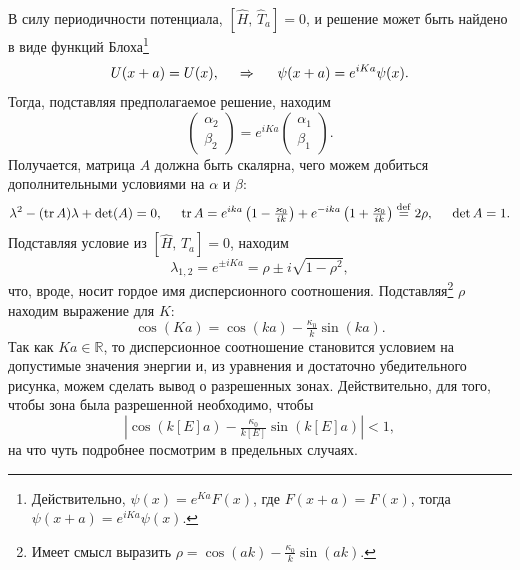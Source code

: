 В силу периодичности потенциала, $[\hat{H},\, \hat{T}_a] = 0$, и решение может быть найдено в виде функций Блоха\footnote{
    Действительно, $\psi(x) = e^{K a} F(x)$, где $F(x+a) = F(x)$, тогда 
    $\psi(x+a) = e^{i K a} \psi(x)$.
} 
\begin{equation*}
    U(x+a) = U(x),
    \hspace{0.5cm} \Rightarrow \hspace{0.5cm}
    \psi(x+a) = e^{i K a} \psi(x).
\end{equation*}
Тогда, подставляя предполагаемое решение, находим
\begin{equation*}
    \begin{pmatrix}
        \alpha_2 \\ \beta_2
    \end{pmatrix} = e^{i K a} \begin{pmatrix}
        \alpha_1 \\ \beta_1
    \end{pmatrix}.
\end{equation*}
Получается, матрица $A$ должна быть скалярна, чего можем добиться дополнительными условиями на $\alpha$ и $\beta$:
\begin{equation*}
    \lambda^2 - (\mathop{\mathrm{tr}}\nolimits A) \lambda + \det (A) = 0,
    \hspace{5 mm} 
    \mathop{\mathrm{tr}}\nolimits A = e^{i k a} \left(1 - \tfrac{\varkappa_0}{ik}\right) + e^{-ika} \left(
        1 + \tfrac{\varkappa_0}{ik}
    \right) \overset{\mathrm{def}}{=} 2 \rho,
    \hspace{5 mm} 
    \det A = 1.
\end{equation*}
Подставляя условие из $[\hat{H},\, \hat{T}_a] = 0$, находим 
\begin{equation*}
    \lambda_{1, 2} = e^{\pm i K a} = \rho \pm i \sqrt{1 - \rho^2},
\end{equation*}
что, вроде, носит гордое имя дисперсионного соотношения. Подставляя\footnote{
    Имеет смысл выразить $\rho = \cos(ak) - \frac{\kappa_0}{k} \sin(ak)$.
}  $\rho$ находим выражение для $K$:
\begin{equation*}
    \cos (Ka) = \cos (ka) - \tfrac{\kappa_0}{k} \sin (ka).
\end{equation*}
Так как $K a \in \mathbb{R}$, то дисперсионное соотношение становится условием на допустимые значения энергии и, из уравнения и достаточно убедительного рисунка, можем сделать вывод о разрешенных зонах. Действительно, для того, чтобы зона была разрешенной необходимо, чтобы
\begin{equation}
    |\cos (k[E] a) - \tfrac{\kappa_0}{k[E]} \sin (k[E]a)| < 1,
\end{equation}
на что чуть подробнее посмотрим в предельных случаях.

